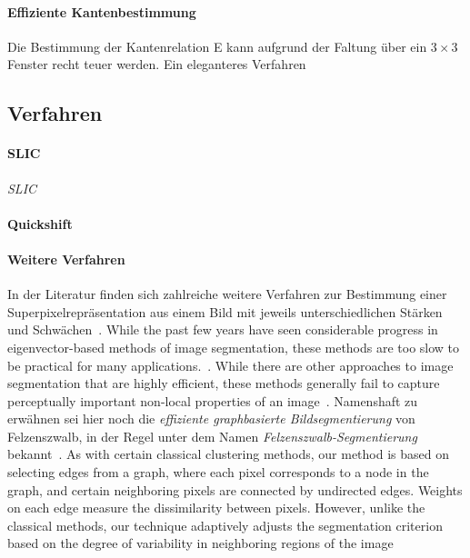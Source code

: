 \paragraph{Effiziente Kantenbestimmung}
\label{kantenbestimmung}

Die Bestimmung der Kantenrelation \gls{E} kann aufgrund der Faltung über ein $3 \times 3$ Fenster recht teuer werden.
Ein eleganteres Verfahren

\subsection{Verfahren}
\label{superpixel_verfahren}

\paragraph{SLIC}
\label{slic}

\emph{\gls{SLIC}}~\cite{slic}

\paragraph{Quickshift}
\label{quickshift}

\cite{quickshift}

\paragraph{Weitere Verfahren}
\label{weitere_superpixel_verfahren}

In der Literatur finden sich zahlreiche weitere Verfahren zur Bestimmung einer Superpixelrepräsentation aus einem Bild mit jeweils unterschiedlichen Stärken und Schwächen~\cite{super, super2}.
While the past few years have seen considerable progress in eigenvector-based
methods of image segmentation, these methods are too slow to be
practical for many applications.~\cite{felzenszwalb}.
While there are other approaches to image segmentation that are highly efficient, these
methods generally fail to capture perceptually important non-local properties of an
image~\cite{felzenszwalb}.
Namenshaft zu erwähnen sei hier noch die \emph{effiziente graphbasierte Bildsegmentierung} von Felzenszwalb, in der Regel unter dem Namen \emph{Felzenszwalb-Segmentierung} bekannt~\cite{felzenszwalb}.
As with certain classical clustering methods, our method is based on
selecting edges from a graph, where each pixel corresponds to a node in the graph,
and certain neighboring pixels are connected by undirected edges. Weights on each
edge measure the dissimilarity between pixels. However, unlike the classical methods,
our technique adaptively adjusts the segmentation criterion based on the degree of
variability in neighboring regions of the image~\cite{felzenszwalb}

